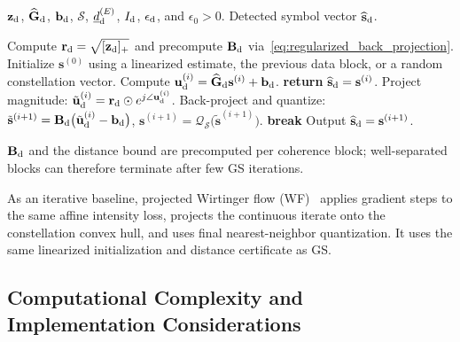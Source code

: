 \documentclass[journal]{IEEEtran}
\begin{document}
\begin{algorithm}[t]
\caption{Reference-Assisted Gerchberg--Saxton Symbol Detection}
\label{alg:reference_assisted_gs}
\begin{algorithmic}[1]
\REQUIRE $\mathbf{z}_{\rm d}$, $\widehat{\mathbf{G}}_{\rm d}$, $\mathbf{b}_{\rm d}$, $\mathcal{S}$, $\underline{d}_{\rm d}^{(E)}$, $I_{\rm d}$, $\epsilon_{\rm d}$, and $\epsilon_0 > 0$.
\ENSURE Detected symbol vector $\widehat{\mathbf{s}}_{\rm d}$.

\STATE Compute $\mathbf{r}_{\rm d} = \sqrt{[\mathbf{z}_{\rm d}]_{+}}$ and precompute $\mathbf{B}_{\rm d}$ via~\eqref{eq:regularized_back_projection}.
\STATE Initialize $\mathbf{s}^{(0)}$ using a linearized estimate, the previous data block, or a random constellation vector.
    \STATE Compute $\mathbf{u}_{\rm d}^{(i)} = \widehat{\mathbf{G}}_{\rm d}\mathbf{s}^{(i)} + \mathbf{b}_{\rm d}$.
        \STATE \textbf{return} $\widehat{\mathbf{s}}_{\rm d} = \mathbf{s}^{(i)}$.
    \ENDIF
    \STATE Project magnitude: $\tilde{\mathbf{u}}_{\rm d}^{(i)} = \mathbf{r}_{\rm d}\odot e^{j\angle\mathbf{u}_{\rm d}^{(i)}}$.
    \STATE Back-project and quantize: $\tilde{\mathbf{s}}^{(i+1)} = \mathbf{B}_{\rm d}\bigl(\tilde{\mathbf{u}}_{\rm d}^{(i)} - \mathbf{b}_{\rm d}\bigr)$, $\mathbf{s}^{(i+1)} = \mathcal{Q}_{\mathcal{S}}\bigl(\tilde{\mathbf{s}}^{(i+1)}\bigr)$.
        \STATE \textbf{break}
    \ENDIF
\ENDFOR
\STATE Output $\widehat{\mathbf{s}}_{\rm d} = \mathbf{s}^{(i+1)}$.
\end{algorithmic}
\end{algorithm}

$\mathbf B_{\rm d}$ and the distance bound are precomputed per coherence block;
well-separated blocks can therefore terminate after few GS iterations.

As an iterative baseline, projected Wirtinger flow (WF)~\cite{candes2015wirtinger} applies gradient steps
to the same affine intensity loss, projects the continuous iterate onto the
constellation convex hull, and uses final nearest-neighbor quantization. It uses
the same linearized initialization and distance certificate as GS.


\subsection{Computational Complexity and Implementation Considerations}
\label{subsec:complexity_implementation}
\end{document}
